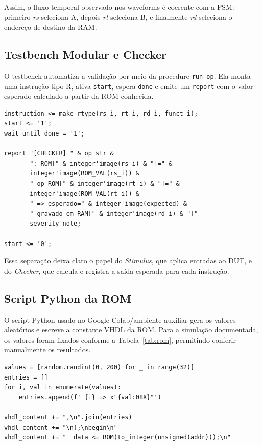 \documentclass[conference]{IEEEtran}
\begin{document}
Assim, o fluxo temporal observado nos waveforms é coerente com a FSM: primeiro \textit{rs} seleciona A, depois \textit{rt} seleciona B, e finalmente \textit{rd} seleciona o endereço de destino da RAM.

\subsection{Testbench Modular e Checker}
O testbench automatiza a validação por meio da procedure \texttt{run\_op}. Ela monta uma instrução tipo R, ativa \texttt{start}, espera \texttt{done} e emite um \texttt{report} com o valor esperado calculado a partir da ROM conhecida.

\begin{lstlisting}[caption={Trecho do checker automatizado no testbench},label={lst:checkersnippet}]
instruction <= make_rtype(rs_i, rt_i, rd_i, funct_i);
start <= '1';
wait until done = '1';

report "[CHECKER] " & op_str &
       ": ROM[" & integer'image(rs_i) & "]=" &
       integer'image(ROM_VAL(rs_i)) &
       " op ROM[" & integer'image(rt_i) & "]=" &
       integer'image(ROM_VAL(rt_i)) &
       " => esperado=" & integer'image(expected) &
       " gravado em RAM[" & integer'image(rd_i) & "]"
       severity note;

start <= '0';
\end{lstlisting}

Essa separação deixa claro o papel do \textit{Stimulus}, que aplica entradas ao DUT, e do \textit{Checker}, que calcula e registra a saída esperada para cada instrução.

\subsection{Script Python da ROM}
O script Python usado no Google Colab/ambiente auxiliar gera os valores aleatórios e escreve a constante VHDL da ROM. Para a simulação documentada, os valores foram fixados conforme a Tabela~\ref{tab:rom}, permitindo conferir manualmente os resultados.

\begin{lstlisting}[caption={Núcleo do gerador Python da ROM}]
values = [random.randint(0, 200) for _ in range(32)]
entries = []
for i, val in enumerate(values):
    entries.append(f' {i} => x"{val:08X}"')

vhdl_content += ",\n".join(entries)
vhdl_content += "\n);\nbegin\n"
vhdl_content += "  data <= ROM(to_integer(unsigned(addr)));\n"
\end{lstlisting}
\end{document}

